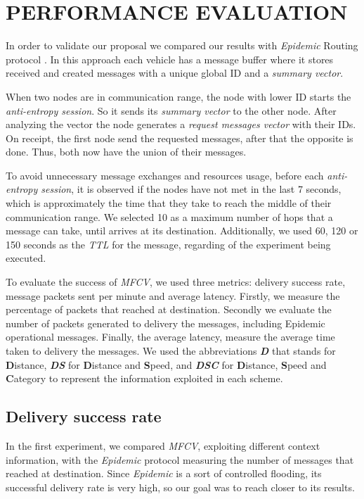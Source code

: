 \documentclass[letterpaper, 10 pt, conference]{ieeeconf}  %
\begin{document}
\section{PERFORMANCE EVALUATION}

In order to validate our proposal we compared our results with \emph{Epidemic} Routing protocol \cite{Vahdat-2000}. In this approach each vehicle has a message buffer where it stores received and created messages with a unique global ID and a \emph{summary vector}.

When two nodes are in communication range, the node with lower ID starts the \emph{anti-entropy session}. So it sends its \emph{summary vector} to the other node. After analyzing the vector the node generates a \emph{request messages vector} with their IDs. On receipt, the first node send the requested messages, after that the opposite is done. Thus, both now have the union of their messages.

To avoid unnecessary message exchanges and resources usage, before each \emph{anti-entropy session}, it is observed if the nodes have not met in the last 7 seconds, which is approximately the time that they take to reach the middle of their communication range. We selected 10 as a maximum number of hops that a message can take, until arrives at its destination. Additionally, we used 60, 120 or 150 seconds as the \emph{TTL} for the message, regarding of the experiment being executed.

To evaluate the success of \emph{MFCV}, we used three metrics: delivery success rate, message packets sent per minute and average latency. Firstly, we measure the percentage of packets that reached at destination. Secondly we evaluate the number of packets generated to delivery the messages, including Epidemic operational messages. Finally, the average latency, measure the average time taken to delivery the messages. We used the abbreviations \textbf{\emph{D}} that stands for \textbf{D}istance, \textbf{\emph{DS}} for \textbf{D}istance and \textbf{S}peed, and \textbf{\emph{DSC}} for \textbf{D}istance, \textbf{S}peed and \textbf{C}ategory to represent the information exploited in each scheme.

\subsection{Delivery success rate}

In the first experiment, we compared \emph{MFCV}, exploiting different context information, with the \emph{Epidemic} protocol measuring the number of messages that reached at destination. Since \emph{Epidemic} is a sort of controlled flooding, its successful delivery rate is very high, so our goal was to reach closer to its results.
\end{document}
